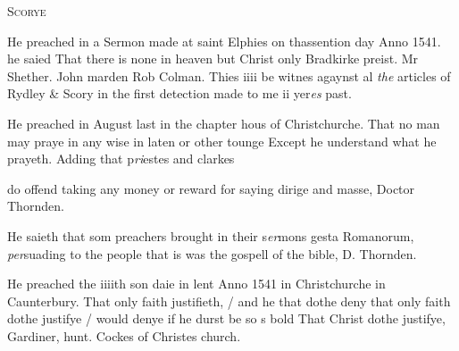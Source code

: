 \documentclass[12pt, a4paper]{book}
\begin{document}
               
               	
				\begin{center}  {\scshape Scorye}  \end{center}
			


               	
               		
			
               		
		\ifthenelse{\isodd{\thepage}}
		{\reversemarginpar}
		{\normalmarginpar}
		He preached in a Sermon made at saint Elphies
 on thassention day Anno 1541. he saied
 That there is none in heaven but Christ only
               			Bradkirke preist. Mr Shether. John marden Rob Colman.
               			Thies iiii be witnes agaynst al \textit{the} articles of Rydley \& Scory
 in the first detection made to me ii yer\textit{es} past.
               	
               	
			
               		
				\marginpar[\vspace{0.5cm}{\textcolor{Gray}{n}}]{}
			
               		
		\ifthenelse{\isodd{\thepage}}
		{\reversemarginpar}
		{\normalmarginpar}
		He preached in August last in the chapter hous
 of Christchurche. That no man may praye
 in any wise in laten or other tounge Except he
 understand what he prayeth. Adding that p\textit{ri}estes and clarkes
			
 do offend taking any money or reward for saying
 dirige and masse, Doctor Thornden.
               	
				\marginpar[\vspace{0.5cm}{\textcolor{Gray}{sclaunderous}}]{}
			
		\ifthenelse{\isodd{\thepage}}
		{\reversemarginpar}
		{\normalmarginpar}
		He saieth that som preachers brought in their s\textit{er}mons
 gesta Romanorum, \textit{per}suading to the people that is
               	was the gospell of the bible, D. Thornden.

		\ifthenelse{\isodd{\thepage}}
		{\reversemarginpar}
		{\normalmarginpar}
		He preached the iiiith son
			daie in lent Anno 1541 in
	Christchurche in Caunterbury. That only faith
 justifieth, / and he that dothe deny that only faith
 dothe justifye / would denye if he durst be
 so s bold That Christ dothe justifye,
	Gardiner, hunt. Cockes of Christes church.
 
\end{document}
